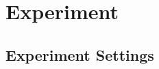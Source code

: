 \documentclass[10pt]{article} %
\begin{document}










\section{Experiment}



\subsection{Experiment Settings}
\label{sec:exp-settings}
\end{document}
